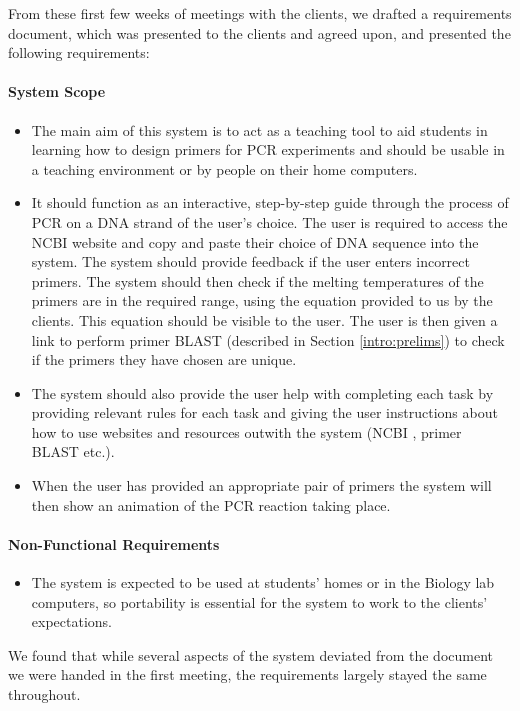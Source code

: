 From these first few weeks of meetings with the clients, we drafted a
requirements document, which was presented to the clients and agreed upon,
and presented the following requirements:

\paragraph{System Scope}
\begin{itemize}
\item{The main aim of this system is to act as a teaching tool to aid 
students in learning how to design primers for PCR experiments and 
should be usable in a teaching environment or by people on their home 
computers.}
\item{It should function as an interactive, step-by-step guide through 
the process of PCR on a DNA strand of the user's choice. The user is 
required to access the NCBI website \cite{ncbi} and copy and paste
their choice of DNA sequence into the system.
The system should provide feedback if the user enters incorrect
primers.
The system should then check if the melting temperatures of the
primers are in the required range, using the equation provided to us
by the clients. This equation should be visible to the user.
The user is then given a link to perform primer BLAST (described in 
Section \ref{intro:prelims})
to check if the primers they have chosen are unique.}
\item{The system should also provide the user help with completing each 
task by providing relevant rules for each task and giving the user 
instructions about how to use websites and resources outwith the system 
(NCBI \cite{ncbi}, primer BLAST \cite{blast} etc.).}
\item{When the user has provided an appropriate pair of primers the 
system will then show an animation of the PCR reaction taking place.}
\end{itemize}
\paragraph{Non-Functional Requirements}
\begin{itemize}
\item{The system is expected to be used at students’ homes or in the 
Biology lab computers, so portability is essential for the system to 
work to the clients’ expectations.}
\end{itemize}

We found that while several aspects of the system deviated from the
document we were handed in the first meeting, the requirements largely
stayed the same throughout.

